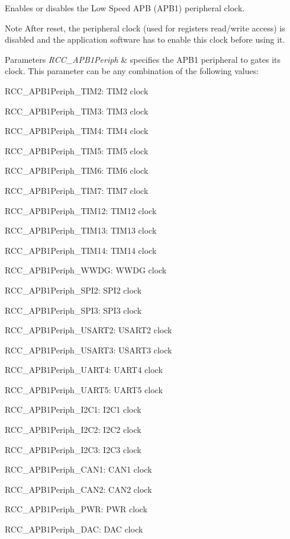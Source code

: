Enables or disables the Low Speed A\+PB (A\+P\+B1) peripheral clock. 

\begin{DoxyNote}{Note}
After reset, the peripheral clock (used for registers read/write access) is disabled and the application software has to enable this clock before using it. 
\end{DoxyNote}

\begin{DoxyParams}{Parameters}
{\em R\+C\+C\+\_\+\+A\+P\+B1\+Periph} & specifies the A\+P\+B1 peripheral to gates its clock. This parameter can be any combination of the following values\+: \begin{DoxyItemize}
\item R\+C\+C\+\_\+\+A\+P\+B1\+Periph\+\_\+\+T\+I\+M2\+: T\+I\+M2 clock \item R\+C\+C\+\_\+\+A\+P\+B1\+Periph\+\_\+\+T\+I\+M3\+: T\+I\+M3 clock \item R\+C\+C\+\_\+\+A\+P\+B1\+Periph\+\_\+\+T\+I\+M4\+: T\+I\+M4 clock \item R\+C\+C\+\_\+\+A\+P\+B1\+Periph\+\_\+\+T\+I\+M5\+: T\+I\+M5 clock \item R\+C\+C\+\_\+\+A\+P\+B1\+Periph\+\_\+\+T\+I\+M6\+: T\+I\+M6 clock \item R\+C\+C\+\_\+\+A\+P\+B1\+Periph\+\_\+\+T\+I\+M7\+: T\+I\+M7 clock \item R\+C\+C\+\_\+\+A\+P\+B1\+Periph\+\_\+\+T\+I\+M12\+: T\+I\+M12 clock \item R\+C\+C\+\_\+\+A\+P\+B1\+Periph\+\_\+\+T\+I\+M13\+: T\+I\+M13 clock \item R\+C\+C\+\_\+\+A\+P\+B1\+Periph\+\_\+\+T\+I\+M14\+: T\+I\+M14 clock \item R\+C\+C\+\_\+\+A\+P\+B1\+Periph\+\_\+\+W\+W\+DG\+: W\+W\+DG clock \item R\+C\+C\+\_\+\+A\+P\+B1\+Periph\+\_\+\+S\+P\+I2\+: S\+P\+I2 clock \item R\+C\+C\+\_\+\+A\+P\+B1\+Periph\+\_\+\+S\+P\+I3\+: S\+P\+I3 clock \item R\+C\+C\+\_\+\+A\+P\+B1\+Periph\+\_\+\+U\+S\+A\+R\+T2\+: U\+S\+A\+R\+T2 clock \item R\+C\+C\+\_\+\+A\+P\+B1\+Periph\+\_\+\+U\+S\+A\+R\+T3\+: U\+S\+A\+R\+T3 clock \item R\+C\+C\+\_\+\+A\+P\+B1\+Periph\+\_\+\+U\+A\+R\+T4\+: U\+A\+R\+T4 clock \item R\+C\+C\+\_\+\+A\+P\+B1\+Periph\+\_\+\+U\+A\+R\+T5\+: U\+A\+R\+T5 clock \item R\+C\+C\+\_\+\+A\+P\+B1\+Periph\+\_\+\+I2\+C1\+: I2\+C1 clock \item R\+C\+C\+\_\+\+A\+P\+B1\+Periph\+\_\+\+I2\+C2\+: I2\+C2 clock \item R\+C\+C\+\_\+\+A\+P\+B1\+Periph\+\_\+\+I2\+C3\+: I2\+C3 clock \item R\+C\+C\+\_\+\+A\+P\+B1\+Periph\+\_\+\+C\+A\+N1\+: C\+A\+N1 clock \item R\+C\+C\+\_\+\+A\+P\+B1\+Periph\+\_\+\+C\+A\+N2\+: C\+A\+N2 clock \item R\+C\+C\+\_\+\+A\+P\+B1\+Periph\+\_\+\+P\+WR\+: P\+WR clock \item R\+C\+C\+\_\+\+A\+P\+B1\+Periph\+\_\+\+D\+AC\+: D\+AC clock \end{DoxyItemize}

\end{DoxyParams}

